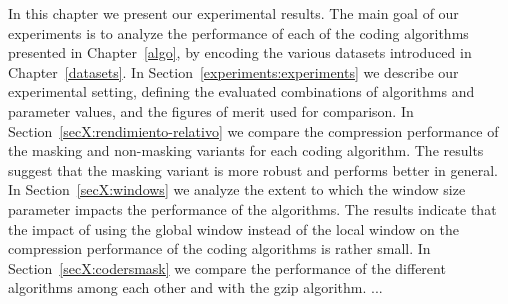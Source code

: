 
In this chapter we present our experimental results. The main goal of our experiments is to analyze the performance of each of the coding algorithms presented in Chapter~\ref{algo}, by encoding the various datasets introduced in Chapter~\ref{datasets}. In Section~\ref{experiments:experiments} we describe our experimental setting, defining the evaluated combinations of algorithms and parameter values, and the figures of merit used for comparison. In Section~\ref{secX:rendimiento-relativo} we compare the compression performance of the masking and non-masking variants for each coding algorithm. The results suggest that the masking variant is more robust and performs better in general. In Section~\ref{secX:windows} we analyze the extent to which the window size parameter impacts the performance of the algorithms. The results indicate that the impact of using the global window instead of the local window on the compression performance of the coding algorithms is rather small. In Section~\ref{secX:codersmask} we compare the performance of the different algorithms among each other and with the gzip algorithm. ...